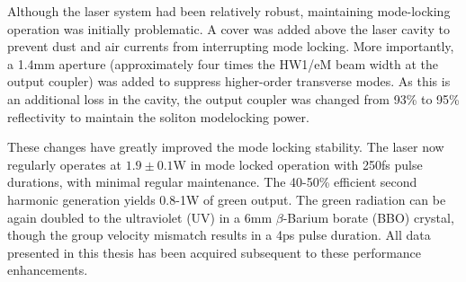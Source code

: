 Although the laser system had been relatively robust, maintaining mode-locking operation was initially problematic.
A cover was added above the laser cavity to prevent dust and air currents from interrupting mode locking.
More importantly, a 1.4mm aperture (approximately four times the HW1/eM beam width at the output coupler) was added to suppress higher-order transverse modes.
As this is an additional loss in the cavity, the output coupler was changed from 93\% to 95\% reflectivity to maintain the soliton modelocking power.

These changes have greatly improved the mode locking stability.
The laser now regularly operates at $1.9 \pm 0.1$W in mode locked operation with 250fs pulse durations, with minimal regular maintenance.
The 40-50\% efficient second harmonic generation yields 0.8-1W of green output.
The green radiation can be again doubled to the ultraviolet (UV) in a 6mm $\beta$-Barium borate (BBO) crystal, though the group velocity mismatch results in a 4ps pulse duration.
All data presented in this thesis has been acquired subsequent to these performance enhancements.


